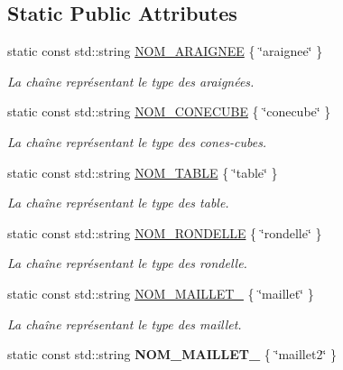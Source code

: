 \subsection*{Static Public Attributes}
\begin{DoxyCompactItemize}
\item 
static const std\+::string \hyperlink{group__inf2990_ga1035430c1c08b95d17f891ae89b33b80}{N\+O\+M\+\_\+\+A\+R\+A\+I\+G\+N\+EE} \{ \char`\"{}araignee\char`\"{} \}
\begin{DoxyCompactList}\small\item\em La chaîne représentant le type des araignées. \end{DoxyCompactList}\item 
static const std\+::string \hyperlink{group__inf2990_gae849656178f4dad34106f525bf37341a}{N\+O\+M\+\_\+\+C\+O\+N\+E\+C\+U\+BE} \{ \char`\"{}conecube\char`\"{} \}
\begin{DoxyCompactList}\small\item\em La chaîne représentant le type des cones-\/cubes. \end{DoxyCompactList}\item 
static const std\+::string \hyperlink{group__inf2990_ga89e651c1a28481ce70f473bd15555114}{N\+O\+M\+\_\+\+T\+A\+B\+LE} \{ \char`\"{}table\char`\"{} \}
\begin{DoxyCompactList}\small\item\em La chaîne représentant le type des table. \end{DoxyCompactList}\item 
static const std\+::string \hyperlink{group__inf2990_ga2ebc17f2d21cd4e66216a7d2c374493e}{N\+O\+M\+\_\+\+R\+O\+N\+D\+E\+L\+LE} \{ \char`\"{}rondelle\char`\"{} \}
\begin{DoxyCompactList}\small\item\em La chaîne représentant le type des rondelle. \end{DoxyCompactList}\item 
static const std\+::string \hyperlink{group__inf2990_ga0c6b49184808c14c52d8e4a2ee00a00e}{N\+O\+M\+\_\+\+M\+A\+I\+L\+L\+E\+T\+\_} \{ \char`\"{}maillet\char`\"{} \}
\begin{DoxyCompactList}\small\item\em La chaîne représentant le type des maillet. \end{DoxyCompactList}\item 
static const std\+::string {\bfseries N\+O\+M\+\_\+\+M\+A\+I\+L\+L\+E\+T\+\_} \{ \char`\"{}maillet2\char`\"{} \}
\item 

\end{DoxyCompactItemize}
